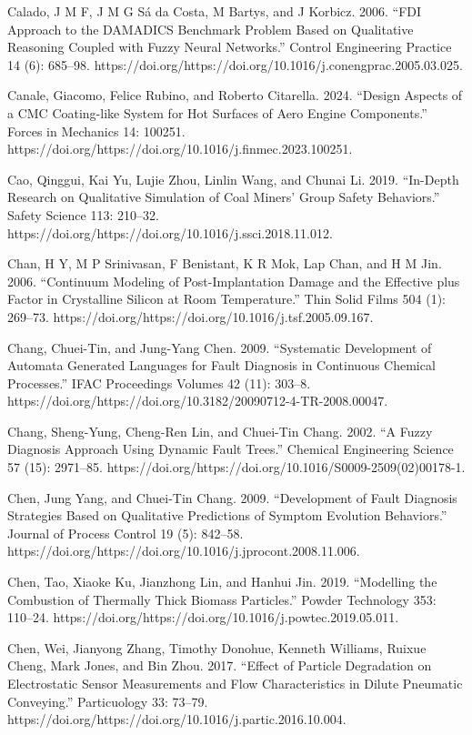 \documentclass[utf8]{gradu3}
\begin{document}
Calado, J M F, J M G Sá da Costa, M Bartys, and J Korbicz. 2006. “FDI Approach to the DAMADICS Benchmark Problem Based on Qualitative Reasoning Coupled with Fuzzy Neural Networks.” Control Engineering Practice 14 (6): 685–98. https://doi.org/https://doi.org/10.1016/j.conengprac.2005.03.025.

Canale, Giacomo, Felice Rubino, and Roberto Citarella. 2024. “Design Aspects of a CMC Coating-like System for Hot Surfaces of Aero Engine Components.” Forces in Mechanics 14: 100251. https://doi.org/https://doi.org/10.1016/j.finmec.2023.100251.

Cao, Qinggui, Kai Yu, Lujie Zhou, Linlin Wang, and Chunai Li. 2019. “In-Depth Research on Qualitative Simulation of Coal Miners’ Group Safety Behaviors.” Safety Science 113: 210–32. https://doi.org/https://doi.org/10.1016/j.ssci.2018.11.012.

Chan, H Y, M P Srinivasan, F Benistant, K R Mok, Lap Chan, and H M Jin. 2006. “Continuum Modeling of Post-Implantation Damage and the Effective plus Factor in Crystalline Silicon at Room Temperature.” Thin Solid Films 504 (1): 269–73. https://doi.org/https://doi.org/10.1016/j.tsf.2005.09.167.

Chang, Chuei-Tin, and Jung-Yang Chen. 2009. “Systematic Development of Automata Generated Languages for Fault Diagnosis in Continuous Chemical Processes.” IFAC Proceedings Volumes 42 (11): 303–8. https://doi.org/https://doi.org/10.3182/20090712-4-TR-2008.00047.

Chang, Sheng-Yung, Cheng-Ren Lin, and Chuei-Tin Chang. 2002. “A Fuzzy Diagnosis Approach Using Dynamic Fault Trees.” Chemical Engineering Science 57 (15): 2971–85. https://doi.org/https://doi.org/10.1016/S0009-2509(02)00178-1.

Chen, Jung Yang, and Chuei-Tin Chang. 2009. “Development of Fault Diagnosis Strategies Based on Qualitative Predictions of Symptom Evolution Behaviors.” Journal of Process Control 19 (5): 842–58. https://doi.org/https://doi.org/10.1016/j.jprocont.2008.11.006.

Chen, Tao, Xiaoke Ku, Jianzhong Lin, and Hanhui Jin. 2019. “Modelling the Combustion of Thermally Thick Biomass Particles.” Powder Technology 353: 110–24. https://doi.org/https://doi.org/10.1016/j.powtec.2019.05.011.

Chen, Wei, Jianyong Zhang, Timothy Donohue, Kenneth Williams, Ruixue Cheng, Mark Jones, and Bin Zhou. 2017. “Effect of Particle Degradation on Electrostatic Sensor Measurements and Flow Characteristics in Dilute Pneumatic Conveying.” Particuology 33: 73–79. https://doi.org/https://doi.org/10.1016/j.partic.2016.10.004.
\end{document}
